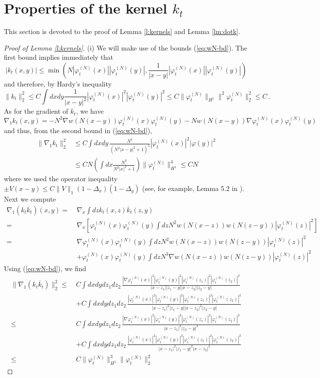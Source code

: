 \documentclass[11pt,a4paper,DIV11]{scrartcl}	%
\newcommand{\ph}{\varphi_t^{(N)}}	%
\begin{document}
\section{Properties of the kernel $k_t$}
\label{sec:kernels}


This section is devoted to the proof of Lemma \ref{l:kernels} and Lemma \ref{lm:dotk}.

\begin{proof}[Proof of Lemma \ref{l:kernels}]
(i) We will make use of the bounds (\ref{eq:wN-bd}). The first bound implies immediately that
\begin{equation}\label{eq:k-pt} |k_t (x,y)| \leq \min \left(N |\ph (x)| |\ph (y)| , \frac{1}{|x-y|} |\ph (x)| |\ph (y)| \right) \end{equation}
and therefore, by Hardy's inequality 
\[ \| k_t \|_2^2 \leq C \int dx dy \frac{1}{|x-y|^2} |\ph (x)|^2 |\ph (y)|^2 \leq C \| \ph \|_{H^1} \|^2 \ph \|_2^2  \leq C \, . \]
As for the gradient of $k_t$, we have
\[ \nabla_1 k_t (x,y) = -N^2 \nabla w (N (x-y)) \ph (x) \ph (y) - N w (N (x-y)) \nabla \ph (x) \ph (y) \]
and thus, from the second bound in (\ref{eq:wN-bd}), 
\[ \begin{split} \| \nabla_1 k_t \|_2^2 & \leq C \int dx dy \, \frac{N^4}{(N^2 |x-y|^2 + 1)^2}  |\ph (x)|^2 |\varphi (y)|^2  \\ & \leq C N \left(\int dx \frac{N^3}{N^2 |x|^2 + 1} \right) \| \ph \|_{H^1}^4 \leq C N \end{split} \]
where we used the operator inequality $\pm V(x-y) \leq C \| V \|_1 (1-\Delta_x) (1-\Delta_y)$ (see, for example, Lemma 5.2 in \cite{ESY0}). Next we compute
\[ \begin{split} 
\nabla_1(k_t \overline{k}_t) (x,y) =\; & \nabla_x \int dz k_t (x,z) \overline{k}_t (z,y) \\ 
= \; &\nabla_x \left[  \ph (x) \ph (y) \int dz N^2 w (N(x-z)) w(N(z-y)) |\ph (z)|^2 \right] \\
= \; &\nabla \ph (x) \ph (y) \int dz N^2 w (N(x-z)) w(N(z-y)) |\ph (z)|^2\\ &+ \ph (x) \ph (y) \int dz N^3 \nabla w (N (x-z)) w(N(z-y)) |\ph (z)|^2 \end{split} \] 
Using (\ref{eq:wN-bd}), we find
\[ \begin{split}  \| \nabla_1 (k_t \overline{k}_t) \|_2^2 \leq \; &C \int dx dy dz_1 dz_2 \, \frac{|\nabla \ph (x)|^2 |\ph (y)|^2 |\ph(z_1)|^2 |\ph (z_2)|^2}{|x-z_1||z_1 -y||x-z_2||z_2 -y|} \\
&+C \int dx dy dz_1 dz_2 \, \frac{|\ph (x)|^2 |\ph (y)|^2 |\ph(z_1)|^2 |\ph (z_2)|^2}{|x-z_1|^2 |z_1 -y| |x-z_2|^2 |z_2 -y|} \\  \leq \; &C \int dx dy dz_1 dz_2 \, \frac{|\nabla \ph (x)|^2 |\ph (y)|^2 |\ph(z_1)|^2 |\ph (z_2)|^2}{|x-z_1|^2 |z_2 -y|^2} \\
&+C \int dx dy dz_1 dz_2 \, \frac{|\ph (x)|^2 |\ph (y)|^2 |\ph(z_1)|^2 |\ph (z_2)|^2}{|x-z_1|^2 |z_1 - y|^2 |x-z_2|^2} \\ \leq \; &C \| \ph \|_{H^1}^3 \| \ph \|^2_2 \end{split}\]


\end{proof}
\end{document}
